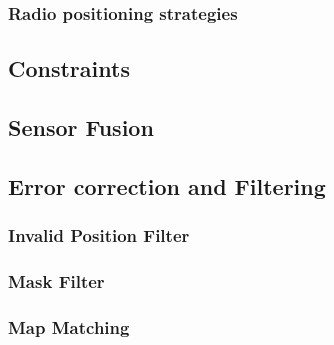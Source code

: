 \subsubsection{Radio positioning strategies}

\subsection{Constraints}

\subsection{Sensor Fusion}

\subsection{Error correction and Filtering} \label{sec:error}

\subsubsection{Invalid Position Filter}

\subsubsection{Mask Filter} 

\subsubsection{Map Matching}

\pagebreak
